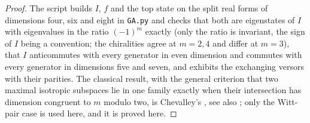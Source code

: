 \documentclass[11pt]{article}
\theoremstyle{definition}
\theoremstyle{plain}
\begin{document}
\begin{proof}
The script builds $I$, $f$ and the top state on the split real forms of dimensions four, six and eight in \texttt{GA.py} and checks that both are eigenstates of $I$ with eigenvalues in the ratio $(-1)^{m}$ exactly (only the ratio is invariant, the sign of $I$ being a convention; the chiralities agree at $m = 2, 4$ and differ at $m = 3$), that $I$ anticommutes with every generator in even dimension and commutes with every generator in dimensions five and seven, and exhibits the exchanging versors with their parities. The classical result, with the general criterion that two maximal isotropic subspaces lie in one family exactly when their intersection has dimension congruent to $m$ modulo two, is Chevalley's \cite[Ch.~III, \S1]{Chevalley1954}, see also \cite{LawsonMichelsohn1989}; only the Witt-pair case is used here, and it is proved here.

\end{proof}
\end{document}
